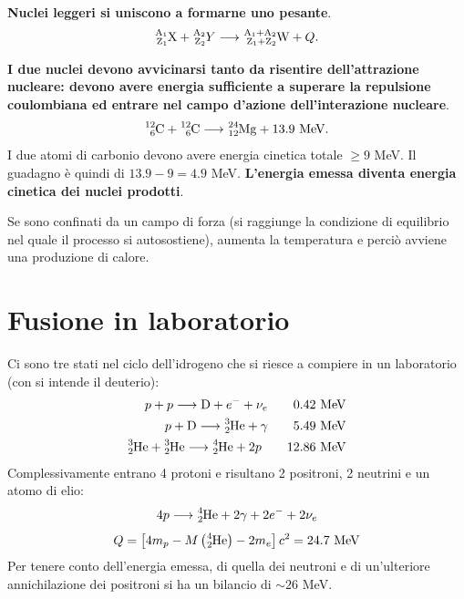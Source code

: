 \documentclass[a4paper,11pt,twoside,openany]{book}
\theoremstyle{definition}
\theoremstyle{plain}
\theoremstyle{plain}
\theoremstyle{definition}
\begin{document}
\textbf{Nuclei leggeri si uniscono a formarne uno pesante}. $$\ce{^{A_1}_{Z_1}X}+\ce{^{A_2}_{Z_2}}Y\longrightarrow \ce{^{A_1+A_2}_{Z_1+Z_2}W}+Q.$$

\textbf{I due nuclei devono avvicinarsi tanto da risentire dell'attrazione nucleare: devono avere energia sufficiente a superare la repulsione coulombiana ed entrare nel campo d'azione dell'interazione nucleare}. $$\ce{^{12}_6C}+\ce{^{12}_6C}\longrightarrow \ce{^{24}_{12}Mg}+ 13.9 \textrm{ MeV}.$$ I due atomi di carbonio devono avere energia cinetica totale $\ge 9$ MeV. Il guadagno è quindi di $13.9-9=4.9$ MeV. \textbf{L'energia emessa diventa energia cinetica dei nuclei prodotti}.

Se sono confinati da un campo di forza (si raggiunge la condizione di equilibrio nel quale il processo si autosostiene), aumenta la temperatura e perciò avviene una produzione di calore.

\section{Fusione in laboratorio} %
Ci sono tre stati nel ciclo dell'idrogeno che si riesce a compiere in un laboratorio (con  si intende il deuterio):
\begin{equation}\begin{split}
p+p\longrightarrow \ce{D}+e^-+\nu_e \qquad 0.42 \textrm{ MeV} \\
p+\ce{D}\longrightarrow \ce{^3_2He}+\gamma \qquad 5.49 \textrm{ MeV} \\
\ce{^3_2He}+\ce{^3_2He}\longrightarrow \ce{^4_2He}+2p \qquad 12.86 \textrm{ MeV}
\end{split}\end{equation}
Complessivamente entrano 4 protoni e risultano 2 positroni, 2 neutrini e un atomo di elio:
\begin{equation}\begin{split}
4p\longrightarrow \ce{^4_2He} +2\gamma+2e^-+2\nu_e
\end{split}\end{equation}
\begin{equation}\begin{split}
Q=\left[4m_p-M\left(\ce{^4_2He}\right)-2m_e\right]c^2=24.7 \textrm{ MeV}
\end{split}\end{equation}
Per tenere conto dell'energia emessa, di quella dei neutroni e di un'ulteriore annichilazione dei positroni si ha un bilancio di $\sim 26$ MeV.
\end{document}
